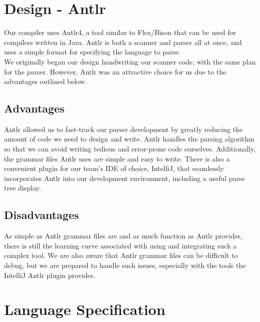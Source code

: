 \documentclass{article}
\begin{document}
\section{Design - Antlr}
Our compiler uses Antlr4, a tool similar to Flex/Bison that can be used for compilers written in Java. Antlr is both a scanner and parser all at once, and uses a simple format for specifying the language to parse.\\
We originally began our design handwriting our scanner code, with the same plan for the parser. However, Antlr was an attractive choice for us due to the advantages outlined below.
\subsection{Advantages}
Antlr allowed us to fast-track our parser development by greatly reducing the amount of code we need to design and write. Antlr handles the parsing algorithm so that we can avoid writing tedious and error-prone code ourselves. Additionally, the grammar files Antlr uses are simple and easy to write. There is also a convenient plugin for our team's IDE of choice, IntelliJ, that seamlessly incorporates Antlr into our development environment, including a useful parse tree display.
\subsection{Disadvantages}
As simple as Antlr grammar files are and as much function as Antlr provides, there is still the learning curve associated with using and integrating such a complex tool. We are also aware that Antlr grammar files can be difficult to debug, but we are prepared to handle such issues, especially with the tools the IntelliJ Antlr plugin provides.


\section{Language Specification}
\end{document}
